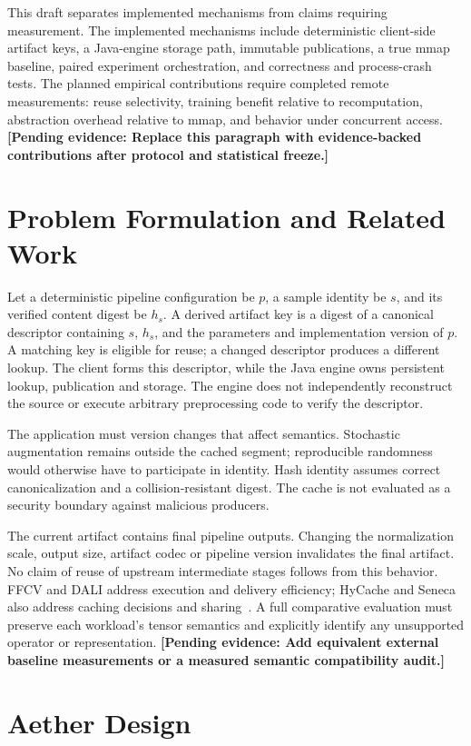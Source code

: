 \documentclass[journal]{IEEEtran}
\newcommand{\pending}[1]{\textbf{[Pending evidence: #1]}}
\begin{document}
This draft separates implemented mechanisms from claims requiring measurement. The implemented mechanisms include deterministic client-side artifact keys, a Java-engine storage path, immutable publications, a true mmap baseline, paired experiment orchestration, and correctness and process-crash tests. The planned empirical contributions require completed remote measurements: reuse selectivity, training benefit relative to recomputation, abstraction overhead relative to mmap, and behavior under concurrent access. \pending{Replace this paragraph with evidence-backed contributions after protocol and statistical freeze.}

\section{Problem Formulation and Related Work}
Let a deterministic pipeline configuration be $p$, a sample identity be $s$, and its verified content digest be $h_s$. A derived artifact key is a digest of a canonical descriptor containing $s$, $h_s$, and the parameters and implementation version of $p$. A matching key is eligible for reuse; a changed descriptor produces a different lookup. The client forms this descriptor, while the Java engine owns persistent lookup, publication and storage. The engine does not independently reconstruct the source or execute arbitrary preprocessing code to verify the descriptor.

The application must version changes that affect semantics. Stochastic augmentation remains outside the cached segment; reproducible randomness would otherwise have to participate in identity. Hash identity assumes correct canonicalization and a collision-resistant digest. The cache is not evaluated as a security boundary against malicious producers.

The current artifact contains final pipeline outputs. Changing the normalization scale, output size, artifact codec or pipeline version invalidates the final artifact. No claim of reuse of upstream intermediate stages follows from this behavior. FFCV and DALI address execution and delivery efficiency; HyCache and Seneca also address caching decisions and sharing~\cite{ffcv,dali,hycache,seneca}. A full comparative evaluation must preserve each workload's tensor semantics and explicitly identify any unsupported operator or representation. \pending{Add equivalent external baseline measurements or a measured semantic compatibility audit.}

\section{Aether Design}
\end{document}
